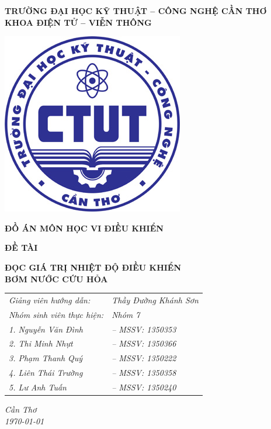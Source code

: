 \begin{titlepage}
	\centering
	\begin{small}
\bfseries{TRƯỜNG ĐẠI HỌC KỸ THUẬT -- CÔNG NGHỆ CẦN THƠ\\KHOA ĐIỆN TỬ -- VIỄN THÔNG\\ \vspace{1cm}}
   \end{small}
	\includegraphics[width=.3\textwidth]{CTUT_logo}\par\vspace{1cm}
	{\Large\bfseries ĐỒ ÁN MÔN HỌC VI ĐIỀU KHIỂN\vspace{.5cm}\par}
	{\Large\bfseries ĐỀ TÀI\vspace{.5cm}\par}
	{\Large\bfseries ĐỌC GIÁ TRỊ NHIỆT ĐỘ ĐIỀU KHIỂN\\ BƠM NƯỚC CỨU HỎA\par}
	\vspace{2cm}
	
	\begin{tabular}{ll}
	{\Large\itshape Giảng viên hướng dẫn:} & {\Large\itshape Thầy Đường Khánh Sơn}\vspace{.3cm}\\
	{\Large\itshape Nhóm sinh viên thực hiện:} &{\Large\itshape Nhóm 7}\vspace{.2cm}\\
		{\Large\itshape \hspace{1.5cm}1. Nguyễn Văn Đình}& {\Large\itshape -- MSSV: 1350353}\vspace{.2cm}\\
	{\Large\itshape \hspace{1.5cm}2. Thi Minh Nhựt}& {\Large\itshape -- MSSV: 1350366}\vspace{.2cm}\\
	{\Large\itshape \hspace{1.5cm}3. Phạm Thanh Quý}& {\Large\itshape -- MSSV: 1350222}\vspace{.2cm}\\
		{\Large\itshape \hspace{1.5cm}4. Liên Thái Trường}& {\Large\itshape -- MSSV: 1350358}\vspace{.2cm}\\
		{\Large\itshape \hspace{1.5cm}5. Lư Anh Tuấn}& {\Large\itshape -- MSSV: 1350240}\vspace{.2cm}\\
	\end{tabular}
	
	\vfill
	
	
	\vfill
	
	{\large \textit{Cần Thơ\\ \today}\par}
\end{titlepage}